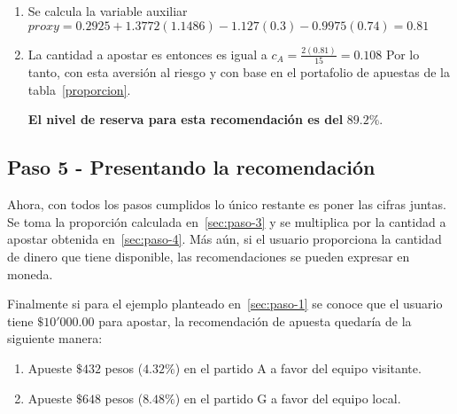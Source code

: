 \begin{enumerate}
\begin{enumerate}
		\item Se calcula la variable auxiliar $proxy = 0.2925 + 1.3772(1.1486) -1.127(0.3) - 0.9975(0.74) = 0.81$
		
		\item La cantidad a apostar es entonces es igual a $c_A = \frac{2(0.81)}{15} = 0.108$
		Por lo tanto, con esta aversión al riesgo y con base en el portafolio de apuestas de la tabla~\ref{proporcion}.
		
		\textbf{El nivel de reserva para esta recomendación es del} $\mathbf{89.2\%}$.
	\end{enumerate}
\end{enumerate}

\subsection{Paso 5 - Presentando la recomendación}
\label{sec:paso-5}
Ahora, con todos los pasos cumplidos lo único restante es poner las cifras juntas. Se toma la proporción calculada en~\ref{sec:paso-3} y se multiplica por la cantidad a apostar obtenida en~\ref{sec:paso-4}.
Más aún, si el usuario proporciona la cantidad de dinero que tiene disponible, las recomendaciones se pueden expresar en moneda.

Finalmente si para el ejemplo planteado en~\ref{sec:paso-1} se conoce que el usuario tiene $\$10'000.00$ para apostar, la recomendación de apuesta quedaría de la siguiente manera:
\begin{enumerate}
	\item Apueste $\$432$ pesos ($4.32\%$) en el partido A a favor del equipo visitante.
	\item Apueste $\$648$ pesos ($8.48\%$) en el partido G a favor del equipo local.
\end{enumerate}


